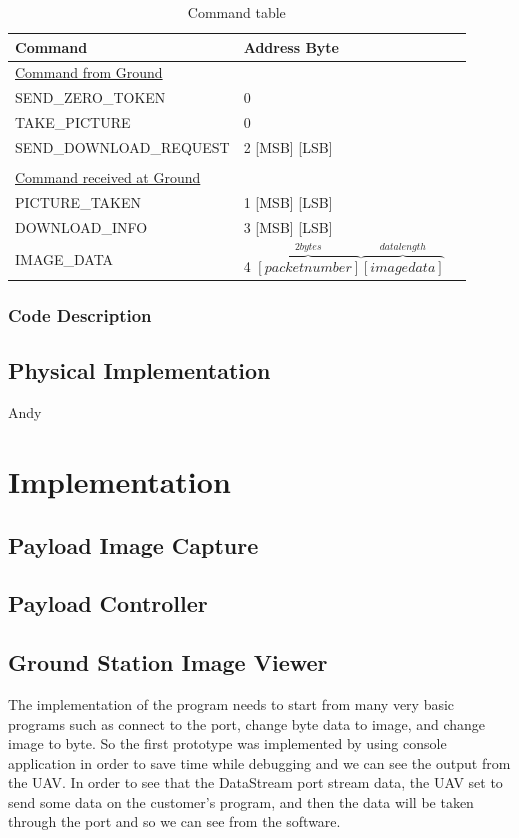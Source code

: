 \documentclass[oneside]{ecsgdp}         %
\begin{document}
\begin{table}[!htbp]

\begin{center}
\begin{tabular}{l l @{.} l}
 Command&
\multicolumn{2}{l}{Address Byte } \\

\hline
\underline{Command from Ground} & \\
SEND\_ZERO\_TOKEN & 0 \\
TAKE\_PICTURE & 0 \\
SEND\_DOWNLOAD\_REQUEST & 2 [MSB] [LSB]  \\
\\
\underline{Command received at Ground}\\
PICTURE\_TAKEN & 1 [MSB] [LSB]\\
DOWNLOAD\_INFO & 3 [MSB] [LSB]\\
IMAGE\_DATA & 4 $\overbrace{ [packet number]}^{2bytes} \overbrace{[image data]}^{data length}$ \\
\end{tabular}
\caption{Command table\label{command_table}}
\end{center}
\end{table}

\subsection{Code Description}

\section{Physical Implementation}
Andy

\chapter{Implementation}


\section{Payload Image Capture}

\section{Payload Controller}

\section{Ground Station Image Viewer}
The implementation of the program needs to start from many very basic programs such as connect to the port, change byte data to image, and change image to byte. So the first prototype was implemented by using console application in order to save time while debugging and we can see the output from the UAV. In order to see that the DataStream port stream data, the UAV set to send some data on the customer’s program, and then the data will be taken through the port and so we can see from the software. 
\end{document}
